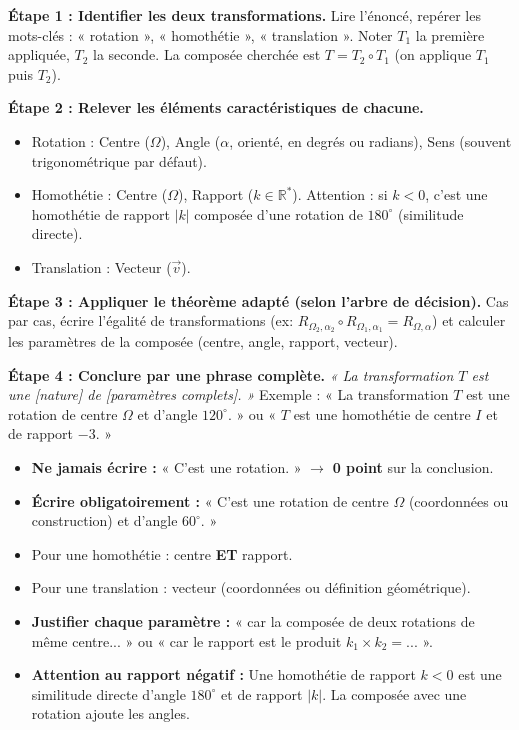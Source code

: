 \documentclass[11pt]{article}
\begin{document}
\begin{methode}
\textbf{Étape 1 : Identifier les deux transformations.}
Lire l'énoncé, repérer les mots-clés : « rotation », « homothétie », « translation ». Noter $T_1$ la première appliquée, $T_2$ la seconde. La composée cherchée est $T = T_2 \circ T_1$ (on applique $T_1$ puis $T_2$).

\textbf{Étape 2 : Relever les éléments caractéristiques de chacune.}
\begin{itemize}
    \item Rotation : Centre ($\Omega$), Angle ($\alpha$, orienté, en degrés ou radians), Sens (souvent trigonométrique par défaut).
    \item Homothétie : Centre ($\Omega$), Rapport ($k \in \mathbb{R}^*$). Attention : si $k<0$, c'est une homothétie de rapport $|k|$ composée d'une rotation de $180^\circ$ (similitude directe).
    \item Translation : Vecteur ($\vec{v}$).
\end{itemize}

\textbf{Étape 3 : Appliquer le théorème adapté (selon l'arbre de décision).}
Cas par cas, écrire l'égalité de transformations (ex: $R_{\Omega_2,\alpha_2} \circ R_{\Omega_1,\alpha_1} = R_{\Omega,\alpha}$) et calculer les paramètres de la composée (centre, angle, rapport, vecteur).

\textbf{Étape 4 : Conclure par une phrase complète.}
\textit{« La transformation $T$ est une [nature] de [paramètres complets]. »}
Exemple : « La transformation $T$ est une rotation de centre $\Omega$ et d'angle $120^\circ$. » ou « $T$ est une homothétie de centre $I$ et de rapport $-3$. »
\end{methode}

\begin{attention}
\begin{itemize}
    \item \textbf{Ne jamais écrire :} « C'est une rotation. » $\rightarrow$ \textbf{0 point} sur la conclusion.
    \item \textbf{Écrire obligatoirement :} « C'est une rotation de centre $\Omega$ (coordonnées ou construction) et d'angle $60^\circ$. »
    \item Pour une homothétie : centre \textbf{ET} rapport.
    \item Pour une translation : vecteur (coordonnées ou définition géométrique).
    \item \textbf{Justifier chaque paramètre :} « car la composée de deux rotations de même centre... » ou « car le rapport est le produit $k_1 \times k_2 = ...$ ».
    \item \textbf{Attention au rapport négatif :} Une homothétie de rapport $k<0$ est une similitude directe d'angle $180^\circ$ et de rapport $|k|$. La composée avec une rotation ajoute les angles.
\end{itemize}
\end{attention}
\end{document}
